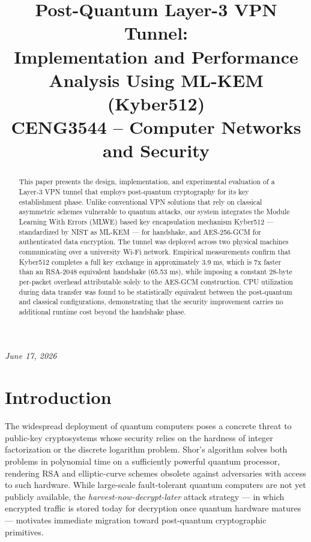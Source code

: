 \documentclass[conference,onecolumn]{IEEEtran}
\title{Post-Quantum Layer-3 VPN Tunnel:\\
Implementation and Performance Analysis Using ML-KEM (Kyber512)\\[0.5em]
\large CENG3544 -- Computer Networks and Security}
\author{
\IEEEauthorblockN{Mustafa Aydın}
\IEEEauthorblockA{Computer Engineering\\
Marmara University\\
Istanbul, Turkey\\
\texttt{mustafaa@posta.mu.edu.tr}}
\and
\IEEEauthorblockN{Alperen Polat}
\IEEEauthorblockA{Computer Engineering\\
Marmara University\\
Istanbul, Turkey\\
\texttt{alperenpolat@posta.mu.edu.tr}}
}
\begin{document}
\maketitle

\begin{center}
\textit{June 17, 2026}
\end{center}
\vspace{0.5em}

\begin{abstract}
This paper presents the design, implementation, and experimental evaluation of a Layer-3 VPN tunnel that employs post-quantum cryptography for its key establishment phase. Unlike conventional VPN solutions that rely on classical asymmetric schemes vulnerable to quantum attacks, our system integrates the Module Learning With Errors (MLWE) based key encapsulation mechanism Kyber512 — standardized by NIST as ML-KEM — for handshake, and AES-256-GCM for authenticated data encryption. The tunnel was deployed across two physical machines communicating over a university Wi-Fi network. Empirical measurements confirm that Kyber512 completes a full key exchange in approximately 3.9 ms, which is 7x faster than an RSA-2048 equivalent handshake (65.53 ms), while imposing a constant 28-byte per-packet overhead attributable solely to the AES-GCM construction. CPU utilization during data transfer was found to be statistically equivalent between the post-quantum and classical configurations, demonstrating that the security improvement carries no additional runtime cost beyond the handshake phase.
\end{abstract}

\section{Introduction}

The widespread deployment of quantum computers poses a concrete threat to public-key cryptosystems whose security relies on the hardness of integer factorization or the discrete logarithm problem. Shor's algorithm solves both problems in polynomial time on a sufficiently powerful quantum processor, rendering RSA and elliptic-curve schemes obsolete against adversaries with access to such hardware. While large-scale fault-tolerant quantum computers are not yet publicly available, the \textit{harvest-now-decrypt-later} attack strategy — in which encrypted traffic is stored today for decryption once quantum hardware matures — motivates immediate migration toward post-quantum cryptographic primitives.
\end{document}
